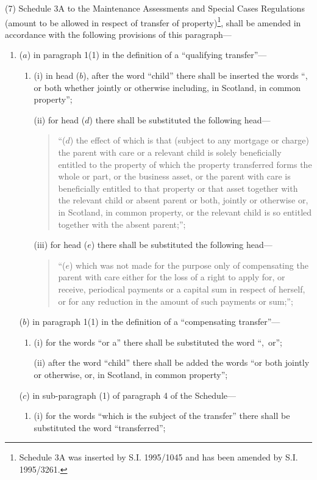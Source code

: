 \documentclass[12pt,a4paper]{article}
\begin{document}
(7) Schedule 3A to the Maintenance Assessments and Special Cases Regulations (amount to be allowed in respect of transfer of property)\footnote{\frenchspacing Schedule 3A was inserted by S.I. 1995/1045 and has been amended by S.I. 1995/3261.}, shall be amended in accordance with the following provisions of this paragraph—
\begin{enumerate}\item[]
($a$) in paragraph 1(1) in the definition of a “qualifying transfer”—
\begin{enumerate}\item[]
(i) in head ($b$), after the word “child” there shall be inserted the words “, or both whether jointly or otherwise including, in Scotland, in common property”;

(ii) for head ($d$) there shall be substituted the following head—
\begin{quotation}
“($d$) the effect of which is that (subject to any mortgage or charge) the parent with care or a relevant child is solely beneficially entitled to the property of which the property transferred forms the whole or part, or the business asset, or the parent with care is beneficially entitled to that property or that asset together with the relevant child or absent parent or both, jointly or otherwise or, in Scotland, in common property, or the relevant child is so entitled together with the absent parent;”;
\end{quotation}

(iii) for head ($e$) there shall be substituted the following head—
\begin{quotation}
“($e$) which was not made for the purpose only of compensating the parent with care either for the loss of a right to apply for, or receive, periodical payments or a capital sum in respect of herself, or for any reduction in the amount of such payments or sum;”;
\end{quotation}
\end{enumerate}

($b$) in paragraph 1(1) in the definition of a “compensating transfer”—
\begin{enumerate}\item[]
(i) for the words “or a” there shall be substituted the word “,~or”;

(ii) after the word “child” there shall be added the words “or both jointly or otherwise, or, in Scotland, in common property”;
\end{enumerate}

($c$) in sub-paragraph (1) of paragraph 4 of the Schedule—
\begin{enumerate}\item[]
(i) for the words “which is the subject of the transfer” there shall be substituted the word “transferred”;


\end{enumerate}
\end{enumerate}
\end{document}
